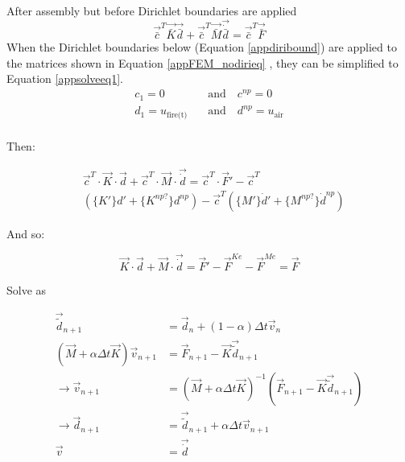 After assembly but before Dirichlet boundaries are applied 
\begin{equation}\label{appFEM_nodirieq}
\vec{\bar{c}}^T \vec{\bar{K}} \vec{\bar{d}} + \vec{\bar{c}}^T \vec{\bar{M}} \vec{\dot{\bar{d}}} = \vec{\bar{c}}^T \vec{\bar{F}}
\end{equation}
When the Dirichlet boundaries below (Equation \ref{appdiribound}) are applied to the matrices shown in Equation \ref{appFEM_nodirieq} , they can be simplified to Equation \ref{appsolveeq1}.
\begin{equation}\label{appdiribound}
\begin{aligned}
c_1 = 0 \quad &\text{and} \quad c^{np}=0\\
d_1 = u_{\text{fire(t)}}\quad &\text{and} \quad d^{np} = u_{\text{air}}\\
\end{aligned}
\end{equation}

Then:

\begin{equation}\label{appsolveeq1}
\begin{aligned}
&\vec{c}^T\cdot\vec{K}\cdot\vec{d} + \vec{c}^T\cdot\vec{M}\cdot\vec{\dot{d}} = \vec{c}^T\cdot\vec{F}' - \vec{c}^T\\
&\left(\{K'\}d'+ \{K^{np?}\}d^{np}\right)- \vec{c}^T \left(\{M'\}\dot{d}' + \{M^{np?}\}\dot{d}^{np} \right)
\end{aligned}
\end{equation}


And so:

\begin{equation}\label{appsolveeq2}
\vec{K}\cdot\vec{d} + \vec{M}\cdot\vec{\dot{d}} = \vec{F}' - \vec{F}^{Ke} - \vec{F}^{Me} = \vec{F}
\end{equation}

Solve as

\begin{equation}\label{appsolveeq3}
\begin{aligned}
\vec{\tilde{d}}_{n+1} &= \vec{d}_n + (1-\alpha)\Delta t \vec{v}_n \\
(\vec{M} + \alpha\Delta t\vec{K})\vec{v}_{n+1} &= \vec{F}_{n+1} - \vec{K} \vec{\tilde{d}}_{n+1} \\
\rightarrow \vec{v}_{n+1} &= (\vec{M} + \alpha\Delta t \vec{K})^{-1} (\vec{F}_{n+1} - \vec{K} \vec{\tilde{d}}_{n+1}) \\
\rightarrow \vec{d}_{n+1} &= \vec{\tilde{d}}_{n+1} + \alpha\Delta t \vec{v}_{n+1} \\
\vec{v} &= \vec{\dot{d}}
\end{aligned}
\end{equation}
